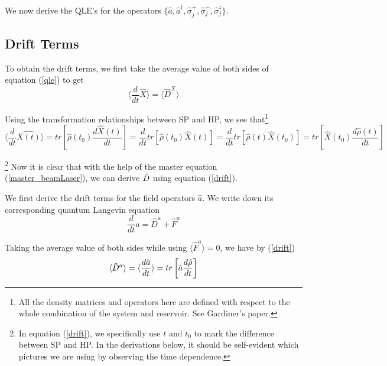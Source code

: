 \documentclass{article}
\newcommand{\szj}{\hat{\sigma}^z_j}
\newcommand{\spj}{\hat{\sigma}^+_j}
\newcommand{\smj}{\hat{\sigma}^-_j}
\begin{document}
We now derive the QLE's for the operators $\{\hat{a}, \hat{a}^\dagger, \spj, \smj, \szj\}$. 

\subsection{Drift Terms}
To obtain the drift terms, we first take the average value of both sides of equation (\ref{qle}) to get
\begin{equation}
    \langle \frac{d}{dt}\hat{X} \rangle = \langle\hat{D}^X\rangle
\end{equation}

Using the transformation relationships between SP and HP, we see that\footnote{All the density matrices and operators here are defined with respect to the whole combination of the system and reservoir. See Gardiner's paper.}
\begin{equation}
\label{drift}
    \langle \frac{d}{dt}\hat{X(t)} \rangle = tr\left[\hat{\rho}(t_0)\frac{d\hat{X}(t)}{dt}\right] = \frac{d}{dt}tr\left[\hat{\rho}(t_0)\hat{X}(t)\right] =\frac{d}{dt}tr\left[\hat{\rho}(t)\hat{X}(t_0)\right]=  tr\left[\hat{X}(t_0)\frac{d\hat{\rho}(t)}{dt}\right]
\end{equation}

\footnote{In equation (\ref{drift}), we specifically use $t$ and $t_0$ to mark the difference between SP and HP. In the derivations below, it should be self-evident which pictures we are using by observing the time dependence.} Now it is clear that with the help of the master equation (\ref{master_beamLaser}), we can derive $\Hat{D}$ using equation (\ref{drift}).

We first derive the drift terms for the field operators $\hat{a}$. We write down its corresponding quantum Langevin equation
\begin{equation}
    \frac{d}{dt}\hat{a} = \hat{D}^a + \hat{F}^a
\end{equation}

Taking the average value of both sides while using $\langle \hat{F}^a \rangle = 0$,  we have by (\ref{drift})
\begin{equation}
    \langle \hat{D}^a \rangle = \langle\frac{d \Hat{a}}{dt}\rangle  = tr\left[\Hat{a} \frac{d\Hat{\rho}}{dt}\right]
\end{equation}
\end{document}

